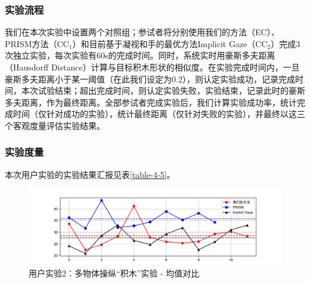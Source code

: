 \subsubsection{实验流程}

我们在本次实验中设置两个对照组；参试者将分别使用我们的方法（EC）、PRISM方法（CC$_1$）和目前基于凝视和手的最优方法Implicit Gaze（CC$_2$）完成3次独立实验，每次实验有60s的完成时间。同时，系统实时用豪斯多夫距离（Hausdorff Distance）计算与目标积木形状的相似度。在实验完成时间内，一旦豪斯多夫距离小于某一阈值（在此我们设定为0.2），则认定实验成功，记录完成时间，本次试验结束；超出完成时间，则认定实验失败，实验结束，记录此时的豪斯多夫距离，作为最终距离。全部参试者完成实验后，我们计算实验成功率，统计完成时间（仅针对成功的实验），统计最终距离（仅针对失败的实验），并最终以这三个客观度量评估实验结果。

\subsubsection{实验度量}

本次用户实验的实验结果汇报见表\ref{table-4-5}。

\begin{figure}[t!]
    \centering
    \includegraphics[width=\textwidth]{figure/user-study-2-avg.png}
    \caption{用户实验2：多物体操纵“积木”实验 - 均值对比}
    \label{fig-4-4}
\end{figure}

